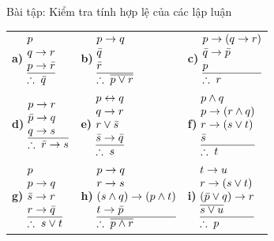 \documentclass[12pt,a4paper]{article}
\makeatletter
\newcommand{\suyluan}[2]{%
  \begin{array}{@{}l@{}}
    #1 \\ \hline
    \therefore\; #2
  \end{array}%
}
\makeatother
\begin{document}
\begin{baitap}{Bài tập: Kiểm tra tính hợp lệ của các lập luận}
\begin{center}
\renewcommand{\arraystretch}{1.6}
\begin{tabular}{@{}p{}p{}p{}@{}}
\textbf{a)}\; $\suyluan{p \\ q \to r \\ p \to \bar{r}}{\bar{q}}$ &
\textbf{b)}\; $\suyluan{p \to q \\ \bar{q} \\ \bar{r}}{\overline{p \lor r}}$ &
\textbf{c)}\; $\suyluan{p \to (q \to r) \\ \bar{q} \to \bar{p} \\ p}{r}$ \\[24pt]
\textbf{d)}\; $\suyluan{p \to r \\ \bar{p} \to q \\ q \to s}{\bar{r} \to s}$ &
\textbf{e)}\; $\suyluan{p \leftrightarrow q \\ q \to r \\ r \lor \bar{s} \\ \bar{s} \to \bar{q}}{s}$ &
\textbf{f)}\; $\suyluan{p \land q \\ p \to (r \land q) \\ r \to (s \lor t) \\ \bar{s}}{t}$ \\[28pt]
\textbf{g)}\; $\suyluan{p \\ p \to q \\ \bar{s} \to r \\ r \to \bar{q}}{s \lor t}$ &
\textbf{h)}\; $\suyluan{p \to q \\ r \to s \\ (s \land q) \to (p \land t) \\ t \to \bar{p}}{\overline{p \land r}}$ &
\textbf{i)}\; $\suyluan{t \to u \\ r \to (s \lor t) \\ (\bar{p} \lor q) \to r \\ \overline{s \lor u}}{p}$
\end{tabular}
\end{center}
\end{baitap}
\end{document}
